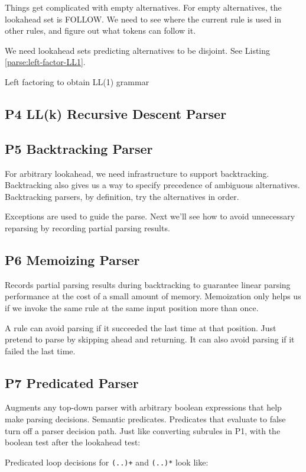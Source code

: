 Things get complicated with empty alternatives.
For empty alternatives, the lookahead set is FOLLOW.
We need to see where the current rule is used in other rules,
and figure out what tokens can follow it.

We need lookahead sets predicting alternatives to be disjoint.
See Listing \ref{parse:left-factor-LL1}.

\begin{program}
\caption{Left factoring to obtain LL(1) grammar\label{parse:left-factor-LL1}}
\end{program}


\subsection{P4 LL(k) Recursive Descent Parser}


\subsection{P5 Backtracking Parser}

For arbitrary lookahead, we need infrastructure to support backtracking.
Backtracking also gives us a way to specify
precedence of ambiguous alternatives.
Backtracking parsers, by definition, try the alternatives in order.


Exceptions are used to guide the parse.
Next we'll see how to avoid unnecessary reparsing
by recording partial parsing results.


\subsection{P6 Memoizing Parser}

Records partial parsing results during backtracking
to guarantee linear parsing performance
at the cost of a small amount of memory.
Memoization only helps us
if we invoke the same rule at the same input position more than once.

A rule can avoid parsing if it succeeded the last time at that position.
Just pretend to parse by skipping ahead and returning.
It can also avoid parsing if it failed the last time.


\subsection{P7 Predicated Parser}
Augments any top-down parser with arbitrary boolean expressions
that help make parsing decisions.
Semantic predicates.
Predicates that evaluate to false turn off a parser decision path.
Just like converting subrules in P1,
with the boolean test after the lookahead test:


Predicated loop decisions for \verb=(..)+= and \verb=(..)*= look like:
